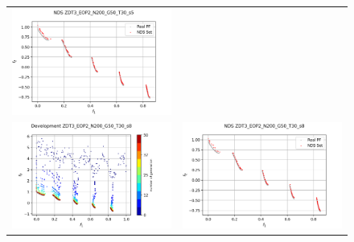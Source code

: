 \begin{figure}[H]
\begin{tabular}{c c}
    \includegraphics[scale=0.5]{figures/ZDT3_EOP2_N200_G50_T30/s5_nds.png}\\
    \includegraphics[scale=0.5]{figures/ZDT3_EOP2_N200_G50_T30/s8_dev.png} &
    \includegraphics[scale=0.5]{figures/ZDT3_EOP2_N200_G50_T30/s8_nds.png}\\

\end{tabular}
\end{figure}
